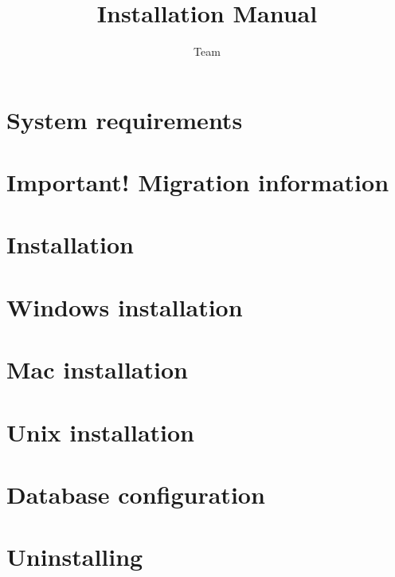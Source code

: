 
%
\title{\app{} Installation Manual}
\author*{\app{} Team}{}
\maketitle


\tableofcontents
\renewcommand{\bxcomment}[2]{}%
\clearpage
\setcounter{secnumdepth}{2}%

\chapter{System requirements}

\clearpage
\chapter{Important! Migration information}

\clearpage
\chapter{Installation}

\clearpage
\chapter{Windows installation}

\clearpage
\chapter{Mac installation}

\clearpage
\chapter{Unix installation}
\label{Unix}


\chapter{Database configuration}

\clearpage
\chapter{Uninstalling \app{}}

